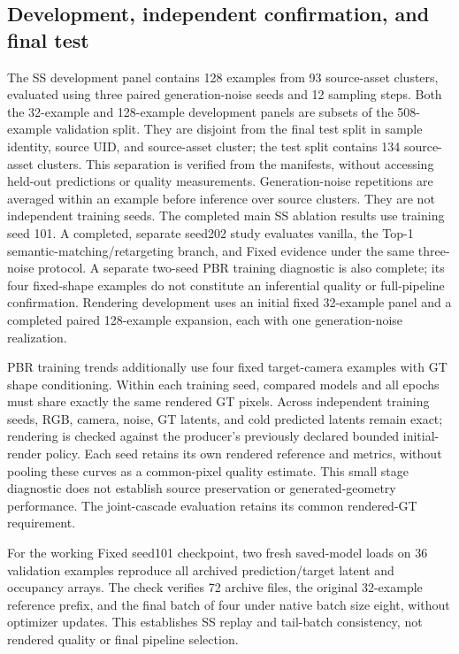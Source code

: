 \documentclass[10pt]{article}
\begin{document}
\subsection{Development, independent confirmation, and final test}
The SS development panel contains 128 examples from 93 source-asset clusters,
evaluated using three paired generation-noise seeds and 12 sampling steps.
Both the 32-example and 128-example development panels are subsets of the
508-example validation split. They are disjoint from the final test split in
sample identity, source UID, and source-asset cluster; the test split contains
134 source-asset clusters. This separation is verified from the manifests,
without accessing held-out predictions or quality measurements.
Generation-noise repetitions are averaged within an example before inference
over source clusters. They are not independent training seeds. The completed
main SS ablation results use training seed 101. A completed, separate seed202
study evaluates vanilla, the Top-1 semantic-matching/retargeting branch, and
Fixed evidence under the same three-noise protocol. A separate two-seed PBR
training diagnostic is also complete; its four fixed-shape examples do not
constitute an inferential quality or full-pipeline confirmation.
Rendering development uses an initial fixed 32-example panel and a completed
paired 128-example expansion, each with one generation-noise realization.

PBR training trends additionally use four fixed target-camera examples with
GT shape conditioning. Within each training seed, compared models and all
epochs must share exactly the same rendered GT pixels. Across independent
training seeds, RGB, camera, noise, GT latents, and cold predicted latents
remain exact; rendering is checked against the producer's previously declared
bounded initial-render policy. Each seed retains its own rendered reference
and metrics, without pooling these curves as a common-pixel quality estimate.
This small stage diagnostic does not establish source preservation or
generated-geometry performance. The joint-cascade evaluation retains its
common rendered-GT requirement.

For the working Fixed seed101 checkpoint, two fresh saved-model loads on
36 validation examples reproduce all archived prediction/target latent and
occupancy arrays. The check verifies 72 archive files, the original
32-example reference prefix, and the final batch of four under native
batch size eight, without optimizer updates. This establishes SS replay
and tail-batch consistency, not rendered quality or final pipeline selection.
\end{document}
